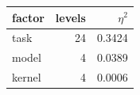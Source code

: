 \begin{tabular}{lrr}
\toprule
factor & levels & $\eta^2$ \\
\midrule
task & 24 & 0.3424 \\
model & 4 & 0.0389 \\
kernel & 4 & 0.0006 \\
\bottomrule
\end{tabular}
